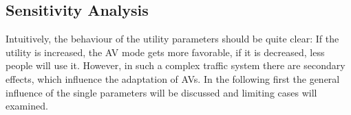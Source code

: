 \subsection{Sensitivity Analysis}

Intuitively, the behaviour of the utility parameters should be quite clear: If
the utility is increased, the AV mode gets more favorable, if it is decreased, less
people will use it. However, in such a complex traffic system there are secondary
effects, which influence the adaptation of AVs. In the following first the general
influence of the single parameters will be discussed and limiting cases will examined.
